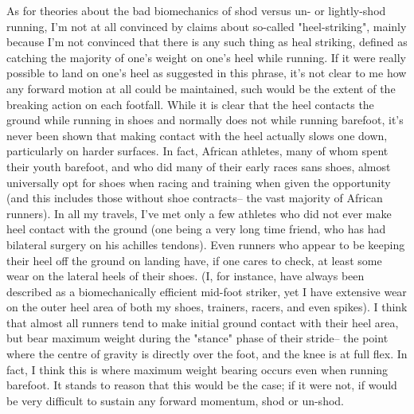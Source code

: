 As for theories about the bad biomechanics of shod versus un- or lightly-shod running, I'm not at all convinced by claims about so-called "heel-striking", mainly because I'm not convinced that there is any such thing as heal striking, defined as catching the majority of one's weight on one's heel while running. If it were really possible to land on one's heel as suggested in this phrase, it's not clear to me how any forward motion at all could be maintained, such would be the extent of the breaking action on each footfall. While it is clear that the heel contacts the ground while running in shoes and normally does not while running barefoot, it's never been shown that making contact with the heel actually slows one down, particularly on harder surfaces. In fact, African athletes, many of whom spent their youth barefoot, and who did many of their early races sans shoes, almost universally opt for shoes when racing and training when given the opportunity (and this includes those without shoe contracts-- the vast majority of African runners). In all my travels, I've met only a few athletes who did not ever make heel contact with the ground (one being a very long time friend, who has had bilateral surgery on his achilles tendons). Even runners who appear to be keeping their heel off the ground on landing have, if one cares to check, at least some wear on the lateral heels of their shoes. (I, for instance, have always been described as a biomechanically efficient mid-foot striker, yet I have extensive wear on the outer heel area of both my shoes, trainers, racers, and even spikes). I think that almost all runners tend to make initial ground contact with their heel area, but bear maximum weight during the "stance" phase of their stride-- the point where the centre of gravity is directly over the foot, and the knee is at full flex. In fact, I think this is where maximum weight bearing occurs even when running barefoot. It stands to reason that this would be the case; if it were not, if would be very difficult to sustain any forward momentum, shod or un-shod.

